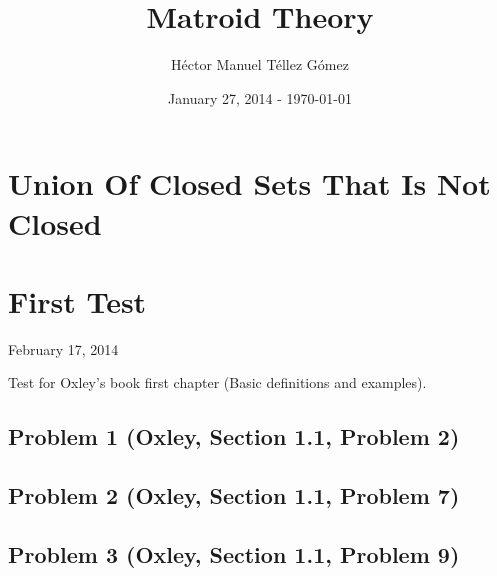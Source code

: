 \frontmatter
\title{Matroid Theory}
\author{Héctor Manuel Téllez Gómez}
\date{January 27, 2014 - \today}
\maketitle

\tableofcontents

\mainmatter


\chapter{Union Of Closed Sets That Is Not Closed}


\chapter{First Test}
    \begin{center} February 17, 2014 \end{center}
    Test for Oxley's book first chapter (Basic definitions and examples). 
    
    \section{Problem 1 (Oxley, Section 1.1, Problem 2)}
        
    
    \section{Problem 2 (Oxley, Section 1.1, Problem 7)}    
        

    \section{Problem 3 (Oxley, Section 1.1, Problem 9)}    
        